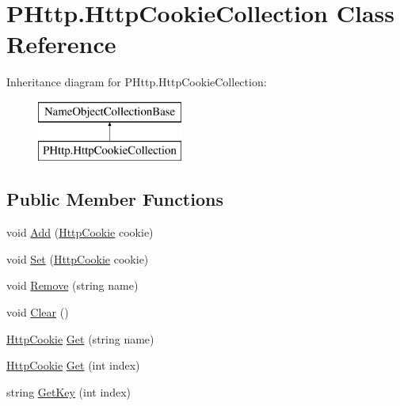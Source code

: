 \hypertarget{class_p_http_1_1_http_cookie_collection}{}\section{P\+Http.\+Http\+Cookie\+Collection Class Reference}
\label{class_p_http_1_1_http_cookie_collection}
Inheritance diagram for P\+Http.\+Http\+Cookie\+Collection\+:\begin{figure}[H]
\begin{center}
\leavevmode
\includegraphics[height=2.000000cm]{class_p_http_1_1_http_cookie_collection}
\end{center}
\end{figure}
\subsection*{Public Member Functions}
\begin{DoxyCompactItemize}
\item 
void \hyperlink{class_p_http_1_1_http_cookie_collection_a9185da5333870236cb197af1fb030173}{Add} (\hyperlink{class_p_http_1_1_http_cookie}{Http\+Cookie} cookie)
\item 
void \hyperlink{class_p_http_1_1_http_cookie_collection_aa990ff46f7aee457f987760b7b549f14}{Set} (\hyperlink{class_p_http_1_1_http_cookie}{Http\+Cookie} cookie)
\item 
void \hyperlink{class_p_http_1_1_http_cookie_collection_ad005a9ec599ff421d16a43a67fedc2cf}{Remove} (string name)
\item 
void \hyperlink{class_p_http_1_1_http_cookie_collection_aad32721505aa0de24c2af898045491bf}{Clear} ()
\item 
\hyperlink{class_p_http_1_1_http_cookie}{Http\+Cookie} \hyperlink{class_p_http_1_1_http_cookie_collection_af770f8eca5e0d3efa3f10cf0f386a9dd}{Get} (string name)
\item 
\hyperlink{class_p_http_1_1_http_cookie}{Http\+Cookie} \hyperlink{class_p_http_1_1_http_cookie_collection_ac9d8892665497f6ed2f6b171607d8654}{Get} (int index)
\item 
string \hyperlink{class_p_http_1_1_http_cookie_collection_a9e2ad64b08eb4cfccff9c3f78f4487fe}{Get\+Key} (int index)
\end{DoxyCompactItemize}
